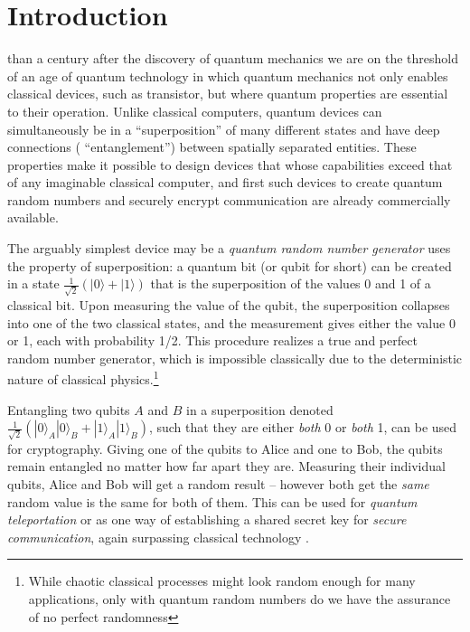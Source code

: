 \documentclass[journal]{IEEEtran}
\begin{document}
\section{Introduction}

 than a century after the discovery of quantum mechanics we are on the threshold of an age of quantum technology in which quantum mechanics not only enables classical devices,  such as transistor, but where quantum properties are essential to their operation. Unlike classical computers, quantum devices can simultaneously be in a ``superposition'' of many different states and have deep connections ( ``entanglement'') between spatially separated entities.  These properties make it possible to design devices that whose capabilities exceed that of any imaginable classical computer, and first such devices to create quantum random numbers and securely encrypt communication are already commercially available. 

The arguably simplest device may be a {\em quantum random number generator} uses the property of superposition:  a quantum bit (or qubit for short) can be created in a state $\frac{1}{\sqrt{2}}(|0\rangle + |1\rangle)$ that is the superposition  of the values 0 and 1 of a classical bit. Upon measuring the value of the qubit, the superposition collapses into one of the two classical states, and the measurement gives either the value 0 or 1, each with probability 1/2. This procedure realizes a true and perfect random number generator, which is impossible classically due to the deterministic nature of classical physics.\footnote{While  chaotic classical processes might look random enough for many applications, only with quantum random numbers do we have the assurance of no perfect randomness}

Entangling two qubits $A$ and $B$ in a superposition denoted $\frac{1}{\sqrt{2}}(|0\rangle_A|0\rangle_B + |1\rangle_A|1\rangle_B)$, such that they are either {\em both} 0 or {\em both} 1, can be used for cryptography. Giving one of the qubits to Alice and one to Bob, the qubits remain entangled no matter how far apart they are. Measuring their individual qubits, Alice and Bob will get a random result -- however both get the {\em same} random value is the same for both of them. This can be used for {\em quantum teleportation} or as one way of establishing a shared secret key for  {\em secure  communication}, again surpassing classical technology \cite{RevModPhys.81.1301,EkertRenner2014}. 
\end{document}
